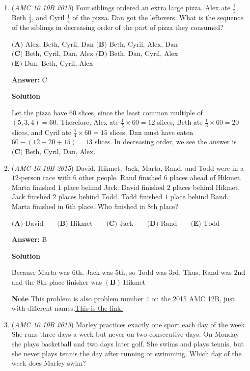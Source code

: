 \begin{enumerate}
 


	\item (\textit{AMC 10 10B 2015}) Four siblings ordered an extra large pizza. Alex ate $\frac15$, Beth $\frac13$, and Cyril $\frac14$ of the pizza. Dan got the leftovers. What is the sequence of the siblings in decreasing order of the part of pizza they consumed?


 $\textbf{(A) } \text{Alex, Beth, Cyril, Dan}$
$\textbf{(B) } \text{Beth, Cyril, Alex, Dan}$
$\textbf{(C) } \text{Beth, Cyril, Dan, Alex}$
$\textbf{(D) } \text{Beth, Dan, Cyril, Alex}$
$\textbf{(E) } \text{Dan, Beth, Cyril, Alex}$

 \textbf{Answer: }C



\textbf{Solution}

Let the pizza have $60$ slices, since the least common multiple of $(5,3,4)=60$.  Therefore, Alex ate $\frac{1}{5}\times60=12$ slices, Beth ate $\frac{1}{3}\times60=20$ slices, and Cyril ate $\frac{1}{4}\times60=15$ slices.  Dan must have eaten $60-(12+20+15)=13$ slices.  In decreasing order, we see the answer is $\boxed{\textbf{(C) }\text{Beth, Cyril, Dan, Alex}}$.

 


	\item (\textit{AMC 10 10B 2015}) David, Hikmet, Jack, Marta, Rand, and Todd were in a $12$-person race with $6$ other people. Rand finished $6$ places ahead of Hikmet. Marta finished $1$ place behind Jack. David finished $2$ places behind Hikmet. Jack finished $2$ places behind Todd. Todd finished $1$ place behind Rand. Marta finished in $6$th place. Who finished in $8$th place?


 $\textbf{(A) } \text{David} \qquad\textbf{(B) } \text{Hikmet} \qquad\textbf{(C) } \text{Jack} \qquad\textbf{(D) } \text{Rand} \qquad\textbf{(E) } \text{Todd}$

 \textbf{Answer: }B



\textbf{Solution}

Because Marta was $6$th, Jack was $5$th, so Todd was $3$rd. Thus, Rand was $2$nd and the 8th place finisher was $\boxed{\mathbf{(B)}\ \mathrm{Hikmet}}$

 \textbf{Note} This problem is also problem number 4 on the 2015 AMC 12B, just with different names.\href{https://artofproblemsolving.com/wiki/index.php/2015\_AMC\_12B\_Problems/Problem\_4}{This is the link.}

 


	\item (\textit{AMC 10 10B 2015}) Marley practices exactly one sport each day of the week. She runs three days a week but never on two consecutive days. On Monday she plays basketball and two days later golf. She swims and plays tennis, but she never plays tennis the day after running or swimming. Which day of the week does Marley swim?



\end{enumerate}
